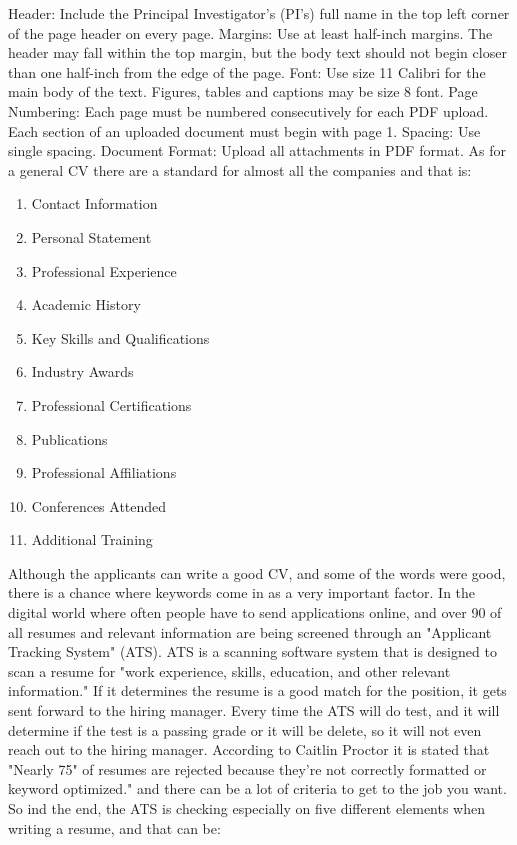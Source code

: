 Header: Include the Principal Investigator’s (PI’s) full name in the top left corner of the page header on every page.
Margins: Use at least half-inch margins. The header may fall within the top margin, but the body text should not begin closer than one half-inch from the edge of the page.
Font: Use size 11 Calibri for the main body of the text. Figures, tables and captions may be size 8 font.
Page Numbering: Each page must be numbered consecutively for each PDF upload. Each section of an uploaded document must begin with page 1.
Spacing: Use single spacing.
Document Format: Upload all attachments in PDF format.\cite{CV_for_PCori}
As for a general CV there are a standard for almost all the companies and that is:
\newpage
\begin{enumerate}

   \item Contact Information
   \item Personal Statement
   \item Professional Experience
   \item Academic History
   \item Key Skills and Qualifications
   \item Industry Awards
   \item Professional Certifications
   \item Publications
   \item Professional Affiliations
   \item Conferences Attended
   \item Additional Training\cite{Format_for_CV}
   \end{enumerate}

Although the applicants can write a good CV, and some of the words were good,
there is a chance where keywords come in as a very important factor. In the digital world where often people have to send applications online, and over 90 %
of all resumes and relevant information are being screened through an "Applicant Tracking System" (ATS). ATS is a scanning software system
that is designed to scan a resume for "work experience, skills, education, and other relevant information."\cite{ATS}
If it determines the resume is a good match for the position, it gets sent forward to the hiring manager.
Every time the ATS will do test, and it will determine if the test is a passing grade or it will be delete, so it will not even reach out to the hiring manager.
According to Caitlin Proctor it is stated that "Nearly 75"
of resumes are rejected because they’re not correctly formatted or keyword optimized." and there can be a lot of criteria
to get to the job you want.\cite{ATS}
So ind the end, the ATS is checking especially on five different elements when writing a resume, and that can be:

